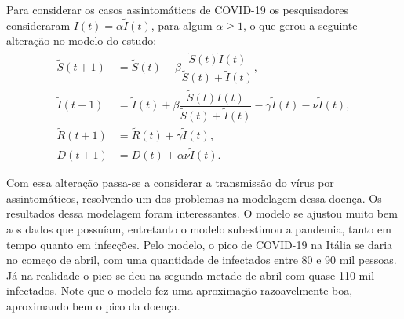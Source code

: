 \documentclass{article}
\begin{document}
Para considerar os casos assintomáticos de COVID-19 os pesquisadores consideraram $I(t) = \alpha\tilde{I}(t)$, para algum $\alpha \geq 1$, o que gerou a seguinte alteração no modelo do estudo:
\begin{equation*}
    \begin{split}
        \tilde{S}(t + 1) & = \tilde{S}(t) - \beta \dfrac{\tilde{S}(t) \tilde{I}(t)}{\tilde{S}(t) + \tilde{I}(t)}, \\
        \tilde{I}(t + 1) & = \tilde{I}(t) + \beta \dfrac{\tilde{S}(t) I(t)}{\tilde{S}(t) + \tilde{I}(t)} - \gamma \tilde{I}(t) - \nu \tilde{I}(t), \\
        \tilde{R}(t + 1) & = \tilde{R}(t) + \gamma \tilde{I}(t), \\
        D(t + 1) & = D(t) + \alpha \nu \tilde{I}(t).
    \end{split}
\end{equation*}

Com essa alteração passa-se a considerar a transmissão do vírus por assintomáticos, resolvendo um dos problemas na modelagem dessa doença. Os resultados dessa modelagem foram interessantes. O modelo se ajustou muito bem aos dados que possuíam, entretanto o modelo subestimou a pandemia, tanto em tempo quanto em infecções. Pelo modelo, o pico de COVID-19 na Itália se daria no começo de abril, com uma quantidade de infectados entre 80 e 90 mil pessoas. Já na realidade o pico se deu na segunda metade de abril com quase 110 mil infectados. Note que o modelo fez uma aproximação razoavelmente boa, aproximando bem o pico da doença.
\end{document}
